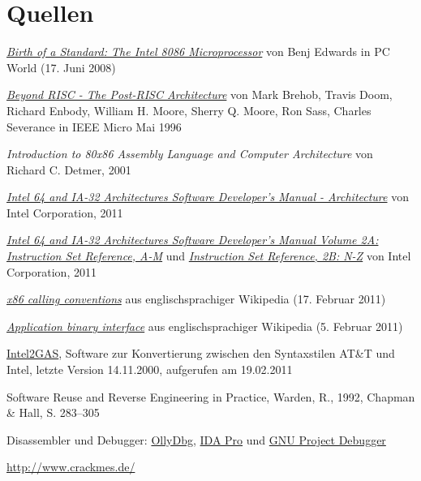 \section{Quellen}

\begin{thebibliography}{9}

  \href{http://www.pcworld.com/article/146957/birth_of_a_standard_the_intel_8086_microprocessor.html}{
  \emph{Birth of a Standard: The Intel 8086 Microprocessor}}
	von Benj Edwards
	in PC World (17. Juni 2008)
	

	\href{http://www.cse.msu.edu/~enbody/postrisc/postrisc2.htm}{\emph{Beyond RISC - The Post-RISC Architecture}}
	von Mark Brehob, Travis Doom, Richard Enbody, William H. Moore, Sherry Q. Moore, Ron Sass, Charles Severance
	in IEEE Micro Mai 1996

	\emph{Introduction to 80x86 Assembly Language and Computer Architecture}
	von Richard C. Detmer,
	2001

	\href{http://www.intel.com/Assets/PDF/manual/253665.pdf}{
	\emph{Intel 64 and IA-32 Architectures Software Developer's Manual - Architecture}}
	von Intel Corporation,
	2011

	\href{http://www.intel.com/Assets/PDF/manual/253666.pdf}{
	\emph{Intel 64 and IA-32 Architectures Software Developer's Manual Volume 2A: Instruction Set Reference, A-M}} und
	\href{http://www.intel.com/Assets/PDF/manual/253667.pdf}{
	\emph{Instruction Set Reference, 2B: N-Z}}	von Intel Corporation,
	2011

	\href{https://secure.wikimedia.org/wikipedia/en/w/index.php?title=X86_calling_conventions&oldid=414385219}{\emph{x86 calling conventions}} aus englischsprachiger Wikipedia (17. Februar 2011)

	\href{https://secure.wikimedia.org/wikipedia/en/w/index.php?title=Application_binary_interface&oldid=412119478}{\emph{Application binary interface}} aus englischsprachiger Wikipedia (5. Februar 2011)

	\href{http://www.niksula.hut.fi/~mtiihone/intel2gas/}{Intel2GAS}, Software zur Konvertierung zwischen den Syntaxstilen AT\&T und Intel, letzte Version 14.11.2000, aufgerufen am 19.02.2011

 Software Reuse and Reverse Engineering in Practice, Warden, R., 1992, Chapman \& Hall, S. 283–305

 Disassembler und Debugger:
	\href{http://www.ollydbg.de/}{OllyDbg}, 
	\href{http://www.hex-rays.com/idapro/}{IDA Pro} und
	\href{http://www.gnu.org/software/gdb/}{GNU Project Debugger}

	\url{http://www.crackmes.de/}
	
\end{thebibliography}
